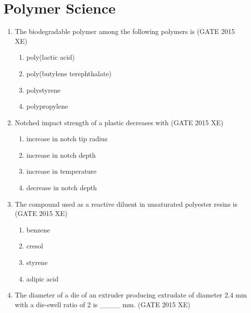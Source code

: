 \documentclass[journal,12pt,onecolumn]{IEEEtran}
\begin{document}
\section*{Polymer Science}
\bigskip
\begin{enumerate}

\item The biodegradable polymer among the following polymers is
\hfill{(GATE 2015 XE)} \\
\begin{multicols}{2}
\begin{enumerate}
\item poly(lactic acid)
\item poly(butylene terephthalate)
\item polystyrene
\item polypropylene
\end{enumerate}
\end{multicols}

\item Notched impact strength of a plastic decreases with
\hfill{(GATE 2015 XE)} \\
\begin{multicols}{2}
\begin{enumerate}
\item increase in notch tip radius
\item increase in notch depth
\item increase in temperature
\item decrease in notch depth
\end{enumerate}
\end{multicols}


\item The compound used as a reactive diluent in unsaturated polyester resins is
\hfill{(GATE 2015 XE)} \\
\begin{multicols}{4}
\begin{enumerate}
\item benzene
\item cresol
\item styrene
\item adipic acid
\end{enumerate}
\end{multicols}


\item The diameter of a die of an extruder producing extrudate of diameter 2.4 mm with a die-swell ratio of 2 is \_\_\_\_ mm.
\hfill{(GATE 2015 XE)} \\



\end{enumerate}
\end{document}
